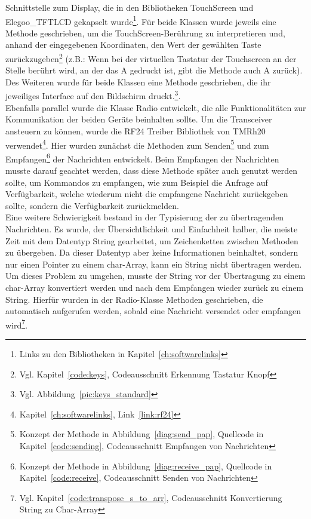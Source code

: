\documentclass[a4paper, 11pt]{scrartcl}
\begin{document}
Schnittstelle zum Display, die in den Bibliotheken \glqq TouchScreen\grqq{} und \glqq Elegoo\_TFTLCD\grqq{} gekapselt wurde\footnote{Links zu den Bibliotheken in Kapitel~\ref{ch:softwarelinks}}.
Für beide Klassen wurde jeweils eine Methode geschrieben, um die TouchScreen-Berührung zu interpretieren und, anhand der eingegebenen Koordinaten, den Wert der gewählten Taste
zurückzugeben\footnote{Vgl. Kapitel~\ref{code:keys}, Codeausschnitt \glqq Erkennung Tastatur Knopf\grqq{}}
(z.B.: Wenn bei der virtuellen Tastatur der Touchscreen an der Stelle berührt wird, an der das \glqq A\grqq{} gedruckt ist, gibt die Methode auch \glqq A\grqq{} zurück).
Des Weiteren wurde für beide Klassen eine Methode geschrieben, die ihr jeweiliges Interface auf den Bildschirm druckt.\footnote{Vgl. Abbildung~\ref{pic:keys_standard}}.
\\
Ebenfalls parallel wurde die Klasse \glqq Radio\grqq{} entwickelt, die alle Funktionalitäten zur Kommunikation der beiden Geräte beinhalten sollte. Um die Transceiver 
ansteuern zu können, wurde die RF24 Treiber Bibliothek von TMRh20 verwendet\footnote{Kapitel~\ref{ch:softwarelinks}, Link~\ref{link:rf24}}. Hier wurden zunächst die 
Methoden zum Senden\footnote{Konzept der Methode in Abbildung~\ref{diag:send_pap}, Quellcode in Kapitel~\ref{code:sending}, Codeausschnitt \glqq Empfangen von Nachrichten\grqq{}} 
und zum Empfangen\footnote{Konzept der Methode in Abbildung~\ref{diag:receive_pap}, Quellcode in Kapitel~\ref{code:receive}, Codeausschnitt \glqq Senden von Nachrichten\grqq{}}
der Nachrichten entwickelt. Beim Empfangen der Nachrichten musste darauf geachtet werden, dass diese Methode später auch genutzt werden sollte, um Kommandos zu empfangen,
wie zum Beispiel die Anfrage auf Verfügbarkeit, welche wiederum nicht die empfangene Nachricht zurückgeben sollte, sondern die Verfügbarkeit zurückmelden.
\\
Eine weitere Schwierigkeit bestand in der Typisierung der zu übertragenden Nachrichten. Es wurde, der Übersichtlichkeit und Einfachheit halber, die meiste Zeit mit
dem Datentyp String gearbeitet, um Zeichenketten zwischen Methoden zu übergeben. Da dieser Datentyp aber keine Informationen beinhaltet, sondern nur einen Pointer
zu einem char-Array, kann ein String nicht übertragen werden. Um dieses Problem zu umgehen, musste der String vor der Übertragung zu einem char-Array konvertiert
werden und nach dem Empfangen wieder zurück zu einem String. Hierfür wurden in der Radio-Klasse Methoden geschrieben, die automatisch aufgerufen werden, sobald
eine Nachricht versendet oder empfangen wird\footnote{Vgl. Kapitel~\ref{code:transpose_s_to_arr}, Codeausschnitt \glqq Konvertierung String zu Char-Array\grqq{}}.
\end{document}
